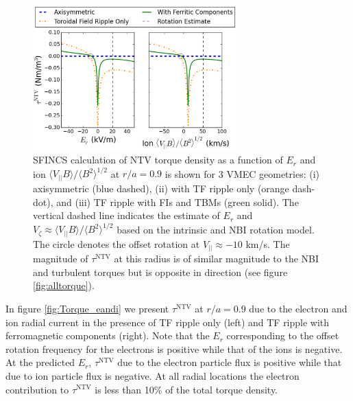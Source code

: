 \documentclass[aip, pop, preprint]{revtex4-1}
\numberwithin{figure}{section}
\numberwithin{equation}{section}
\begin{document}
\FloatBarrier

\begin{figure}[h!]
\centering
\includegraphics[width=0.7\textwidth]{figure6.eps}
\caption{\label{fig:Torque_ErandV} SFINCS calculation of NTV torque density as a function of $E_r$ and ion $\langle V_{||} B \rangle/\langle B^2 \rangle^{1/2}$ at $r/a = 0.9$ is shown for 3 VMEC geometries: (i) axisymmetric (blue dashed), (ii) with TF ripple only (orange dash-dot), and (iii) TF ripple with FIs and TBMs (green solid). The vertical dashed line indicates the estimate of $E_r$ and $V_{\zeta} \approx \langle V_{||} B \rangle/\langle B^2 \rangle^{1/2}$ based on the intrinsic and NBI rotation model. The circle denotes the offset rotation at $V_{||} \approx -10$ km/s. The magnitude of $\tau^{\mathrm{NTV}}$ at this radius is of similar magnitude to the NBI and turbulent torques but is opposite in direction (see figure \ref{fig:alltorque}).}
\end{figure}

In figure \ref{fig:Torque_eandi} we present $\tau^{\mathrm{NTV}}$ at $r/a = 0.9$ due to the electron and ion radial current in the presence of TF ripple only (left) and TF ripple with ferromagnetic components (right). Note that the $E_r$ corresponding to the offset rotation frequency for the electrons is positive while that of the ions is negative. At the predicted $E_r$, $\tau^{\mathrm{NTV}}$ due to the electron particle flux is positive while that due to ion particle flux is negative. At all radial locations the electron contribution to $\tau^{\mathrm{NTV}}$ is less than 10\% of the total torque density. 
\end{document}
